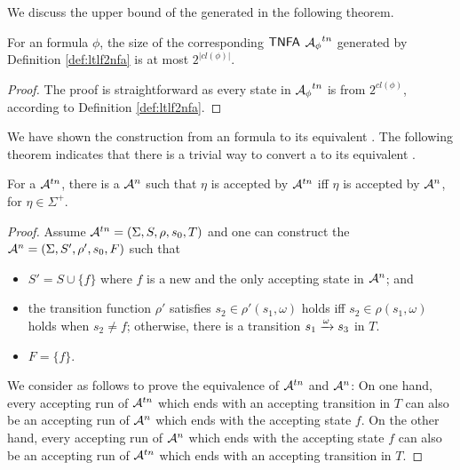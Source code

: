 We discuss the upper bound of the generated \TNFA in the following theorem.

\begin{theorem}\label{thm:tnfaBound}
For an \ltlf formula $\phi$, the size of the corresponding ${\sf TNFA}$ ${\mathcal{A}_{\phi}}^{tn}$ generated by Definition \ref{def:ltlf2nfa} is at most $2^{|cl(\phi)|}$.
\end{theorem}
\begin{proof}
	The proof is straightforward as every state in ${\mathcal{A}_{\phi}}^{tn}$ is from $2^{cl(\phi)}$, according to Definition \ref{def:ltlf2nfa}.
\end{proof}

We have shown the construction from an \ltlf formula to its equivalent \TNFA. The following theorem indicates that there is a trivial way to convert a \TNFA to its equivalent \NFA. 

\begin{theorem}\label{thm:tnfa2nfa}
For a \TNFA $\mathcal{A}^{tn}$, there is a \NFA $\mathcal{A}^n$ such that $\eta$ is accepted by $\mathcal{A}^{tn}$ iff $\eta$ is accepted by $\mathcal{A}^n$, for $\eta\in \Sigma^+$. 
\end{theorem}
\begin{proof}
Assume $\mathcal{A}^{tn}=(\Sigma, S, \rho, s_0, T)$ and one can construct the \NFA $\mathcal{A}^{n} = (\Sigma, S', \rho', s_0, F)$ such that 
\begin{itemize}
	\item $S' = S\cup \{f\}$ where $f$ is a new and the only accepting state in $\mathcal{A}^n$; and 
	\item the transition function $\rho'$ satisfies $s_2\in \rho'(s_1,\omega)$ holds iff $s_2\in \rho(s_1, \omega)$ holds when $s_2\not = f$; otherwise, there is a transition $s_1\xrightarrow[]{\omega}s_3$ in $T$. 
	\item $F=\{f\}$.
\end{itemize}
We consider as follows to prove the equivalence of $\mathcal{A}^{tn}$ and $\mathcal{A}^n$: On one hand, every accepting run of $\mathcal{A}^{tn}$ which ends with an accepting transition in $T$ can also be an accepting run of $\mathcal{A}^n$ which ends with the accepting state $f$. On the other hand, every accepting run of $\mathcal{A}^{n}$ which ends with the accepting state $f$ can also be an accepting run of $\mathcal{A}^{tn}$ which ends with an accepting transition in $T$.
\end{proof}



